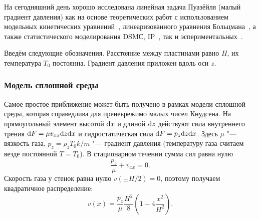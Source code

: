 \newcommand{\muHS}{\hat{\mu}_{\rm{HS}}}
\newcommand{\QHS}{\hat{Q}_{\rm{HS}}}

На сегодняшний день хорошо исследована линейная задача Пуазёйля (малый градиент давления) как на основе
теоретических работ с использованием модельных кинетических уравнений~\cite{Cercignani1963, Cercignani1966, Sharipov1999},
линеаризованного уравнения Больцмана~\cite{Ohwada1989b}, а также статистического моделирования DSMС, IP~\cite{Fan2001},
так и эспериментальных~\cite{Porodnov1974, Ewart2007}.

Введём следующие обозначения. Расстояние между пластинами равно \(H\), их температура \(T_0\) постоянна.
Градиент давления приложен вдоль оси \(z\).

\subsubsection{Модель сплошной среды}

Самое простое приближение может быть получено в рамках модели сплошной среды,
которая справедлива для пренеьрежимо малых чисел Кнудсена.
На прямоугольный элемент высотой \(\mathrm{d} x\) и длиной \(\mathrm{d} z\) действуют сила внутреннего трения
\(\mathrm{d} F = \mu v_{xx} \mathrm{d} z \mathrm{d} x \) и гидростатическая сила \(\mathrm{d} F = p_z \mathrm{d} z \mathrm{d} x \).
Здесь \(\mu\) "--- вязкость газа, \(p_z = \rho_z T_0 k/m\) "--- градиент давления (температуру газа считаем везде постоянной \(T=T_0\)).
В стационарном течении сумма сил равна нулю
\begin{equation}\label{eq:forces}
	\frac{p_z}{\mu} + v_{xx} = 0. 
\end{equation}
Скорость газа у стенок равна нулю \(v(\pm H/2) = 0\), поэтому получаем квадратичное распределение:
\[ v(x) = \frac{p_z}{\mu}\frac{H^2}{8}\left(1-4\frac{x^2}{H^2}\right). \]

